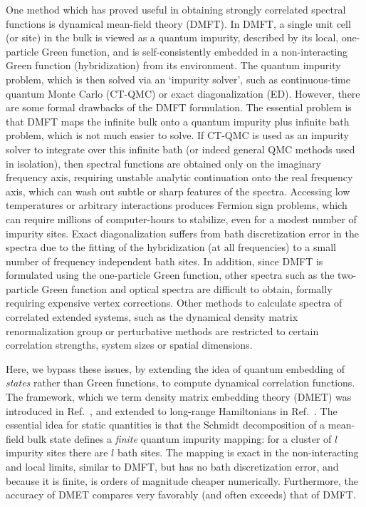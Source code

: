 \documentclass[aps,twocolumn,nobibnotes]{revtex4}
\begin{document}
One method which has proved useful in obtaining strongly correlated spectral functions is dynamical mean-field 
theory (DMFT)\cite{Georges1992,Georges1996,Kotliar2006}. In 
DMFT, a single unit cell (or site) in the bulk is viewed as a quantum impurity, described by its local, one-particle Green function,
and is self-consistently embedded in a non-interacting Green function (hybridization) from its environment.
The quantum impurity problem, which is then solved via an `impurity solver', such as
continuous-time quantum Monte Carlo (CT-QMC)\cite{Millis2006} or exact diagonalization (ED)\cite{Zgid2012}. 
However, there are some formal drawbacks of the DMFT formulation. 
The essential problem is that DMFT maps the infinite bulk onto a quantum impurity plus infinite bath problem, which is not much easier to solve.
If CT-QMC is used as an 
impurity solver to integrate over this infinite bath (or indeed general QMC methods used in isolation), then spectral 
functions are obtained only on the imaginary frequency 
axis, requiring unstable analytic continuation onto the real frequency axis, which can wash out subtle or sharp features of the 
spectra\cite{Millis2009}. Accessing low temperatures or arbitrary interactions produces Fermion sign problems, which can require millions
of computer-hours to stabilize, even for a modest number of impurity sites.
Exact diagonalization suffers from bath discretization error in the spectra due to the 
fitting of the hybridization (at all frequencies) to a small number of frequency independent bath sites\cite{Liebsch2012}. In addition, since DMFT
is formulated using the one-particle Green function, other spectra such as the two-particle Green function and optical spectra are 
difficult to obtain, formally requiring expensive vertex corrections\cite{Millis2012}. Other methods to calculate 
spectra of correlated extended systems, such as the dynamical density matrix renormalization group\cite{Jeckelmann2004} or perturbative
methods\cite{Senechal2000} are restricted to certain correlation strengths, system sizes or spatial dimensions.

Here, we bypass these issues, by extending the idea of quantum embedding of {\em states} rather than Green functions, to compute dynamical
correlation functions. The framework, which we term density matrix embedding theory (DMET) was introduced in 
Ref.~, and extended to long-range Hamiltonians in Ref.~. 
The essential idea for static quantities is that the Schmidt decomposition of a mean-field bulk state defines a {\em finite} quantum impurity mapping:
for a cluster of $l$ impurity sites there are $l$ bath sites. The mapping is exact in the non-interacting and local limits, similar to DMFT, but
has no bath discretization error, and because it is finite, is orders of magnitude cheaper numerically. Furthermore, the accuracy of DMET compares
very favorably (and often exceeds) that of DMFT.
\end{document}
